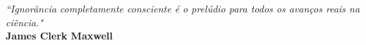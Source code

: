 \begin{epigrafe}
  \vspace*{\fill}
  \hspace*{\fill}\parbox[b]{.5\textwidth}{%
    \linespread{1}\selectfont
    \begin{flushright}
      \textit{``Ignorância completamente consciente é o prelúdio para todos os avanços reais na ciência."}\\
      \vspace{\onelineskip}
      {\bfseries James Clerk Maxwell}
    \end{flushright}
  }
\end{epigrafe}
